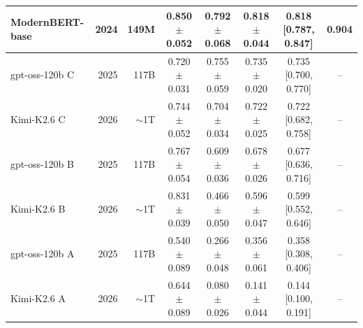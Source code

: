 \begin{tabular}{lrrccccc}
ModernBERT-base & 2024 & 149M & 0.850 $\pm$ 0.052 & 0.792 $\pm$ 0.068 & 0.818 $\pm$ 0.044 & 0.818 [0.787, 0.847] & 0.904 \\
\midrule
gpt-oss-120b C & 2025 & 117B & 0.720 $\pm$ 0.031 & 0.755 $\pm$ 0.059 & 0.735 $\pm$ 0.020 & 0.735 [0.700, 0.770] & -- \\
Kimi-K2.6 C & 2026 & $\sim$1T & 0.744 $\pm$ 0.052 & 0.704 $\pm$ 0.034 & 0.722 $\pm$ 0.025 & 0.722 [0.682, 0.758] & -- \\
gpt-oss-120b B & 2025 & 117B & 0.767 $\pm$ 0.054 & 0.609 $\pm$ 0.036 & 0.678 $\pm$ 0.026 & 0.677 [0.636, 0.716] & -- \\
Kimi-K2.6 B & 2026 & $\sim$1T & 0.831 $\pm$ 0.039 & 0.466 $\pm$ 0.050 & 0.596 $\pm$ 0.047 & 0.599 [0.552, 0.646] & -- \\
gpt-oss-120b A & 2025 & 117B & 0.540 $\pm$ 0.089 & 0.266 $\pm$ 0.048 & 0.356 $\pm$ 0.061 & 0.358 [0.308, 0.406] & -- \\
Kimi-K2.6 A & 2026 & $\sim$1T & 0.644 $\pm$ 0.089 & 0.080 $\pm$ 0.026 & 0.141 $\pm$ 0.044 & 0.144 [0.100, 0.191] & -- \\
\bottomrule
\end{tabular}
